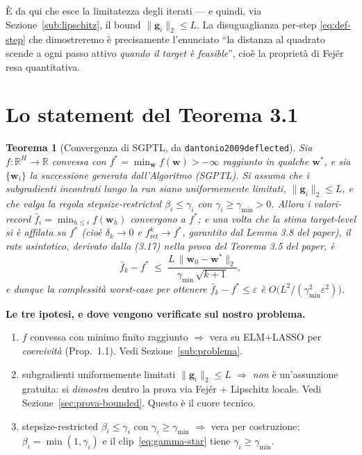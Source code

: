 \documentclass[11pt,a4paper]{article}
\newtheorem{theorem}{Teorema}
\theoremstyle{definition}
\newcommand{\w}{\bm{w}}
\newcommand{\g}{\bm{g}}
\newcommand{\wstar}{\w^{*}}
\newcommand{\fstar}{f^{*}}
\newcommand{\fbar}{\bar{f}}
\newcommand{\gmin}{\gamma_{\min}}
\newcommand{\eps}{\varepsilon}
\newcommand{\norm}[1]{\lVert #1\rVert}
\newcommand{\R}{\mathbb{R}}
\begin{document}
È da qui che esce la limitatezza degli iterati --- e quindi, via
Sezione~\ref{sub:lipschitz}, il bound $\norm{\g_i}_2\le L$. La disuguaglianza per-step
\eqref{eq:def-step} che dimostreremo è precisamente l'enunciato ``la distanza al quadrato
scende a ogni passo attivo \emph{quando il target è feasible}'', cioè la proprietà di Fej\'er
resa quantitativa.

\section{Lo statement del Teorema 3.1}
\label{sec:statement}

\begin{theorem}[Convergenza di SGPTL, da \texttt{dantonio2009deflected}]
\label{thm:main}
Sia $f:\R^H\to\R$ convessa con $\fstar=\min_\w f(\w)>-\infty$ raggiunto in qualche $\wstar$, e
sia $\{\w_i\}$ la successione generata dall'Algoritmo (SGPTL). Si assuma che i subgradienti
incontrati lungo la run siano \emph{uniformemente limitati}, $\norm{\g_i}_2\le L$, e che valga
la regola stepsize-restricted $\beta_i\le\gamma_i$ con $\gamma_i\ge\gmin>0$. Allora i
valori-record $\fbar_i=\min_{h\le i}f(\w_h)$ convergono a $\fstar$; e una volta che la stima
target-level si è affilata su $\fstar$ (cioè $\delta_k\to0$ e $f^k_{\mathrm{ref}}\to\fstar$,
garantito dal Lemma 3.8 del paper), il rate asintotico, derivato dalla (3.17) nella prova del
Teorema 3.5 del paper, è
\begin{equation}\label{eq:rate}
\fbar_k-\fstar \;\le\; \frac{L\,\norm{\w_0-\wstar}_2}{\gmin\,\sqrt{k+1}},
\end{equation}
e dunque la complessità worst-case per ottenere $\fbar_k-\fstar\le\eps$ è
$O\!\big(L^2/(\gmin^2\eps^2)\big)$.
\end{theorem}

\begin{keybox}
\textbf{Le tre ipotesi, e dove vengono verificate sul nostro problema.}
\begin{enumerate}[label=(H\arabic*),leftmargin=2.4em]
\item $f$ convessa con minimo finito raggiunto $\Rightarrow$ vera su ELM+LASSO per
\emph{coercività} (Prop.~1.1). Vedi Sezione~\ref{sub:problema}.
\item subgradienti uniformemente limitati $\norm{\g_i}_2\le L$ $\Rightarrow$ \emph{non} è
un'assunzione gratuita: si \emph{dimostra} dentro la prova via Fej\'er + Lipschitz locale.
Vedi Sezione~\ref{sec:prova-bounded}. Questo è il cuore tecnico.
\item stepsize-restricted $\beta_i\le\gamma_i$ con $\gamma_i\ge\gmin$ $\Rightarrow$ vera per
costruzione: $\beta_i=\min(1,\gamma_i)$ e il clip~\eqref{eq:gamma-star} tiene
$\gamma_i\ge\gmin$.
\end{enumerate}
\end{keybox}
\end{document}
